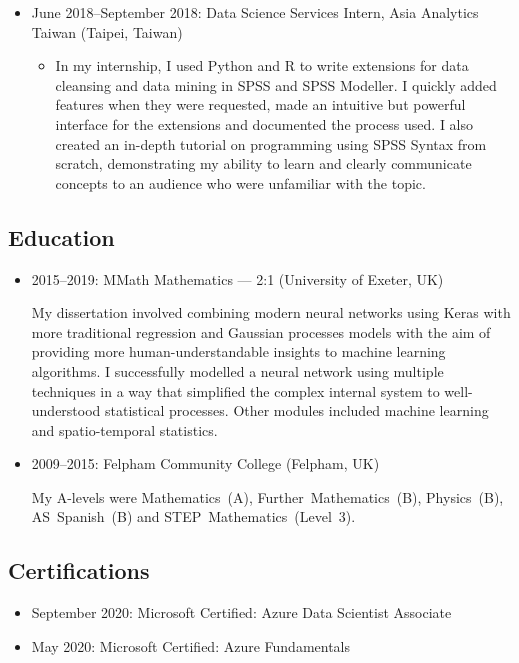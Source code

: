 \documentclass[11pt, a4paper]{article}
\begin{document}
\begin{itemize}
	\item June 2018--September 2018: Data Science Services Intern, Asia Analytics Taiwan (Taipei, Taiwan)
	\begin{itemize}
		\item In my internship, I used Python and R to write extensions for data cleansing and data mining in SPSS and SPSS Modeller.
		I quickly added features when they were requested, made an intuitive but powerful interface for the extensions and documented the process used.
		I also created an in-depth tutorial on programming using SPSS Syntax from scratch, demonstrating my ability to learn and clearly communicate concepts to an audience who were unfamiliar with the topic.
	\end{itemize}
\end{itemize}

\subsection*{Education}

\begin{itemize} 
	\item 2015--2019: MMath Mathematics --- 2:1 (University of Exeter, UK)

	My dissertation involved combining modern neural networks using Keras with more traditional regression and Gaussian processes models with the aim of providing more human-understandable insights to machine learning algorithms.
	I successfully modelled a neural network using multiple techniques in a way that simplified the complex internal system to well-understood statistical processes.
	Other modules included machine learning and spatio-temporal statistics.

	\item 2009--2015: Felpham Community College (Felpham, UK)

	My A-levels were Mathematics~(A), Further~Mathematics~(B), Physics~(B), AS~Spanish~(B) and STEP~Mathematics~(Level~3).
\end{itemize}

\subsection*{Certifications}

\begin{itemize}
	\item September 2020: Microsoft Certified: Azure Data Scientist Associate 

	\item May 2020: Microsoft Certified: Azure Fundamentals 
\end{itemize}
\end{document}

